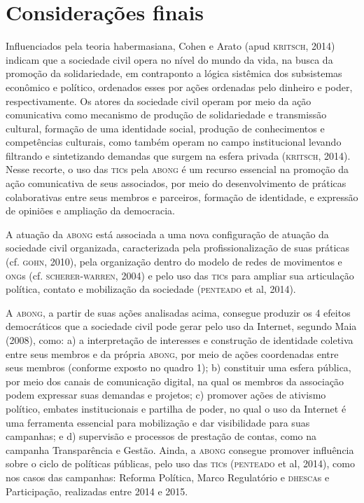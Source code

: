 \section{Considerações finais}

Influenciados pela teoria habermasiana, Cohen e Arato (apud \textsc{kritsch},
2014) indicam que a sociedade civil opera no nível do mundo da vida, na
busca da promoção da solidariedade, em contraponto a lógica sistêmica
dos subsistemas econômico e político, ordenados esses por ações
ordenadas pelo dinheiro e poder, respectivamente. Os atores da sociedade
civil operam por meio da ação comunicativa como mecanismo de produção de
solidariedade e transmissão cultural, formação de uma identidade social,
produção de conhecimentos e competências culturais, como também operam
no campo institucional levando filtrando e sintetizando demandas que
surgem na esfera privada (\textsc{kritsch}, 2014). Nesse recorte, o uso das \textsc{tic}s
pela \textsc{abong} é um recurso essencial na promoção da ação comunicativa de
seus associados, por meio do desenvolvimento de práticas colaborativas
entre seus membros e parceiros, formação de identidade, e expressão de
opiniões e ampliação da democracia.

A atuação da \textsc{abong} está associada a uma nova configuração de atuação da
sociedade civil organizada, caracterizada pela profissionalização de
suas práticas (cf. \textsc{gohn}, 2010), pela organização dentro do modelo de
redes de movimentos e \textsc{ong}s (cf. \textsc{scherer}-\textsc{warren}, 2004) e pelo uso das
\textsc{tic}s para ampliar sua articulação política, contato e mobilização da
sociedade (\textsc{penteado} et al, 2014).

A \textsc{abong}, a partir de suas ações analisadas acima, consegue produzir os 4
efeitos democráticos que a sociedade civil pode gerar pelo uso da
Internet, segundo Maia (2008), como: a) a interpretação de interesses e
construção de identidade coletiva entre seus membros e da própria \textsc{abong},
por meio de ações coordenadas entre seus membros (conforme exposto no
quadro 1); b) constituir uma esfera pública, por meio dos canais de
comunicação digital, na qual os membros da associação podem expressar
suas demandas e projetos; c) promover ações de ativismo político,
embates institucionais e partilha de poder, no qual o uso da Internet é
uma ferramenta essencial para mobilização e dar visibilidade para suas
campanhas; e d) supervisão e processos de prestação de contas, como na
campanha Transparência e Gestão. Ainda, a \textsc{abong} consegue promover
influência sobre o ciclo de políticas públicas, pelo uso das \textsc{tic}s
(\textsc{penteado} et al, 2014), como nos casos das campanhas: Reforma Política,
Marco Regulatório e \textsc{dhesca}s e Participação, realizadas entre 2014 e
2015.

